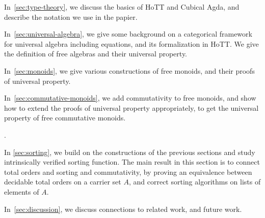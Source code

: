\begin{myitemize}
  \item In~\cref{sec:type-theory}, we discuss the basics of HoTT and Cubical Agda, and describe the notation we use in the papier.
  \item In~\cref{sec:universal-algebra}, we give some background on a categorical framework for universal algebra including equations, and its formalization in HoTT. We give the definition of free algebras and their universal property. 
  \item In~\cref{sec:monoids}, we give various constructions of free monoids, and their proofs of universal property.
  \item In~\cref{sec:commutative-monoids}, we add commutativity to free monoids, and show how to extend the proofs of universal property appropriately, to get the universal property of free commutative monoids.
  \item {}.
  \item In \cref{sec:sorting}, we build on the constructions of the previous sections and study intrinsically verified sorting function. The main result in this section is to connect total orders and sorting and commutativity, by proving an equivalence between decidable total orders on a carrier set $A$, and correct sorting algorithms on lists of elements of $A$.
  \item In~\cref{sec:discussion}, we discuss connections to related work, and future work.
\end{myitemize}
